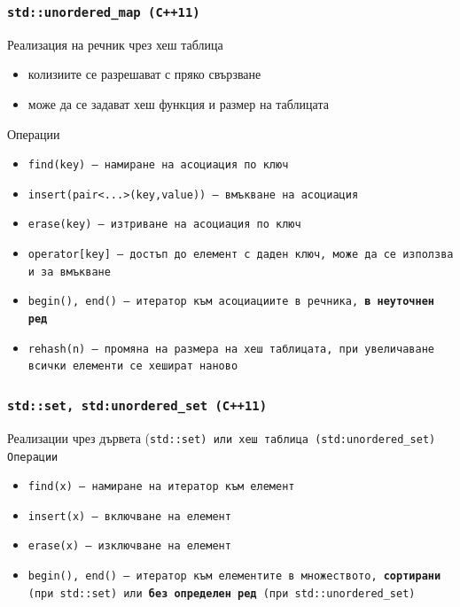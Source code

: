 \documentclass[alsotrans]{beamerswitch}
\begin{document}
\begin{frame}
  \frametitle{\tt{std::unordered\_map} (C++11)}
  Реализация на речник чрез хеш таблица
  \begin{itemize}
  \item колизиите се разрешават с пряко свързване
  \item може да се задават хеш функция и размер на таблицата
  \end{itemize}
  Операции
  \begin{itemize}
  \item \tt{find(key)} --- намиране на асоциация по ключ
  \item \tt{insert(pair<...>(key,value))} --- вмъкване на асоциация
  \item \tt{erase(key)} --- изтриване на асоциация по ключ
  \item \tt{operator[key]} --- достъп до елемент с даден ключ, може да се използва и за вмъкване
  \item \tt{begin(), end()} --- итератор към асоциациите в речника, \textbf{в неуточнен ред}
  \item \tt{rehash(n)} --- промяна на размера на хеш таблицата, при увеличаване всички елементи се хешират наново
  \end{itemize}
\end{frame}


\begin{frame}
  \frametitle{\tt{std::set}, \tt{std:unordered\_set} (C++11)}
  Реализации чрез дървета (\tt{std::set}) или хеш таблица (\tt{std:unordered\_set})\\
  Операции
  \begin{itemize}
  \item \tt{find(x)} --- намиране на итератор към елемент
  \item \tt{insert(x)} --- включване на елемент
  \item \tt{erase(x)} --- изключване на елемент
  \item \tt{begin(), end()} --- итератор към елементите в множеството, \textbf{сортирани} (при \tt{std::set}) или \textbf{без определен ред} (при \tt{std::unordered\_set})
  \end{itemize}
\end{frame}
\end{document}
